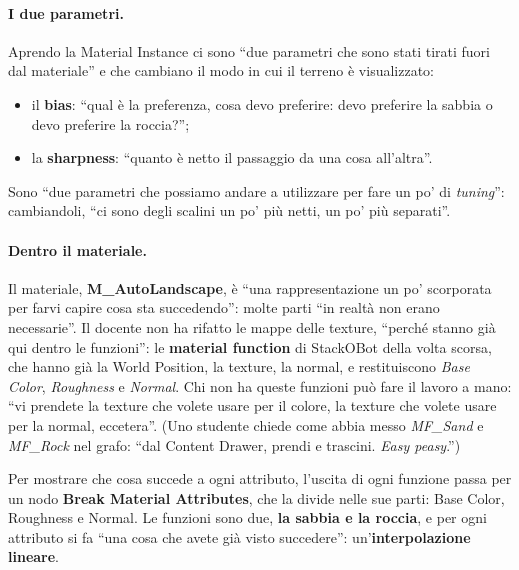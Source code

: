 \paragraph{I due parametri.} Aprendo la Material Instance ci sono ``due parametri che sono
stati tirati fuori dal materiale'' e che cambiano il modo in cui il terreno è
visualizzato:
\begin{itemize}
  \item il \textbf{bias}: ``qual è la preferenza, cosa devo preferire: devo preferire la
        sabbia o devo preferire la roccia?'';
  \item la \textbf{sharpness}: ``quanto è netto il passaggio da una cosa all'altra''.
\end{itemize}
Sono ``due parametri che possiamo andare a utilizzare per fare un po' di \emph{tuning}'':
cambiandoli, ``ci sono degli scalini un po' più netti, un po' più separati''.

\paragraph{Dentro il materiale.} Il materiale, \textbf{M\_AutoLandscape}, è ``una
rappresentazione un po' scorporata per farvi capire cosa sta succedendo'': molte parti ``in
realtà non erano necessarie''. Il docente non ha rifatto le mappe delle texture, ``perché
stanno già qui dentro le funzioni'': le \textbf{material function} di StackOBot della volta
scorsa, che hanno già la World Position, la texture, la normal, e restituiscono
\emph{Base Color}, \emph{Roughness} e \emph{Normal}. Chi non ha queste funzioni può fare il
lavoro a mano: ``vi prendete la texture che volete usare per il colore, la texture che
volete usare per la normal, eccetera''. (Uno studente chiede come abbia messo
\emph{MF\_Sand} e \emph{MF\_Rock} nel grafo: ``dal Content Drawer, prendi e trascini.
\emph{Easy peasy}.'')

Per mostrare che cosa succede a ogni attributo, l'uscita di ogni funzione passa per un nodo
\textbf{Break Material Attributes}, che la divide nelle sue parti: Base Color, Roughness e
Normal. Le funzioni sono due, \textbf{la sabbia e la roccia}, e per ogni attributo si fa
``una cosa che avete già visto succedere'': un'\textbf{interpolazione lineare}.

